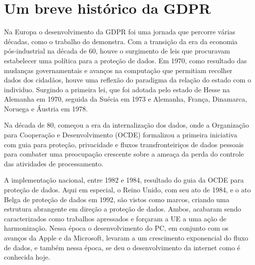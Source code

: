 
\section{Um breve histórico da GDPR}

Na Europa o desenvolvimento da GDPR foi uma jornada que percorre várias décadas, como o trabalho do \citet{Schwerin2018} demonstra. Com a transição da era da economia pós-industrial na década de 60, houve o surgimento de leis que procuravam estabelecer uma política para a proteção de dados. Em 1970, como resultado das mudanças governamentais e avanços na computação que permitiam recolher dados dos cidadãos, houve uma reflexão do paradigma da relação do estado com o individuo. Surgindo a primeira lei, que foi adotada pelo estado de Hesse na Alemanha em 1970, seguida da Suécia em 1973 e Alemanha, França, Dinamarca, Noruega e Áustria em 1978.

Na década de 80, começou a era da internalização dos dados, onde a Organização para Cooperação e Desenvolvimento (OCDE) formalizou a primeira iniciativa com guia para proteção, privacidade e fluxos transfronteiriços de dados pessoais para combater uma preocupação crescente sobre a ameaça da perda do controle das atividades de processamento.

A implementação nacional, entre 1982 e 1984, resultado do guia da OCDE para proteção de dados. Aqui em especial, o Reino Unido, com seu ato de 1984, e o ato Belga de proteção de dados em 1992, são vistos como marcos, criando uma estrutura abrangente em direção a proteção de dados. Ambos, acabaram sendo caracterizados como trabalhos apressados e forçaram a UE a uma ação de harmonização. Nessa época o desenvolvimento do PC, em conjunto com os avanços da Apple e da Microsoft, levaram a um crescimento exponencial do fluxo de dados, e também nessa época, se deu o desenvolvimento da internet como é conhecida hoje.

